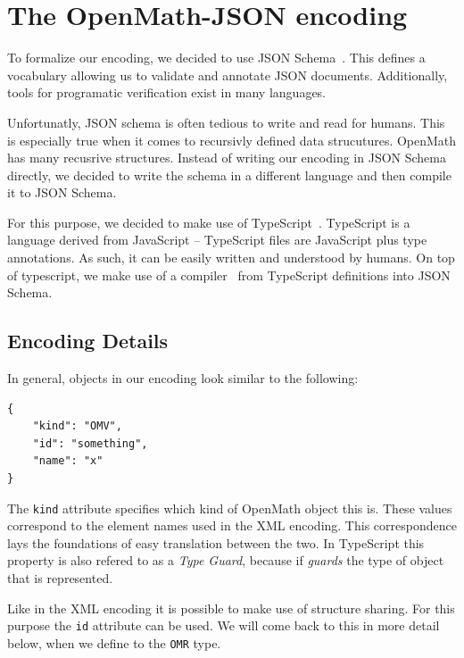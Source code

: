 \section{The OpenMath-JSON encoding}

To formalize our encoding, we decided to use JSON Schema~\cite{handrewsjsonschema:18}. 
This defines a vocabulary allowing us to validate and annotate JSON documents. 
Additionally, tools for programatic verification exist in many languages. 

Unfortunatly, JSON schema is often tedious to write and read for humans. 
This is especially true when it comes to recursivly defined data strucutures.
OpenMath has many recusrive structures.
Instead of writing our encoding in JSON Schema directly, we decided to write the schema in a different language and then compile it to JSON Schema. 

For this purpose, we decided to make use of TypeScript~\cite{typescript:webpage}. 
TypeScript is a language derived from JavaScript -- TypeScript files are JavaScript plus type annotations. 
As such, it can be easily written and understood by humans. 
On top of typescript, we make use of a compiler~\cite{vega-ts-jscon-schema-generator:webpage} from TypeScript definitions into JSON Schema. 

\subsection{Encoding Details}

In general, objects in our encoding look similar to the following:
\\\begin{minipage}{\linewidth}\begin{lstlisting}
{
    "kind": "OMV",
    "id": "something",
    "name": "x"
}
\end{lstlisting}\end{minipage}

The \texttt{kind} attribute specifies which kind of OpenMath object this is. 
These values correspond to the element names used in the XML encoding. 
This correspondence lays the foundations of easy translation between the two. 
In TypeScript this property is also refered to as a \textit{Type Guard}, because if \textit{guards} the type of object that is represented. 

Like in the XML encoding it is possible to make use of structure sharing. 
For this purpose the \texttt{id} attribute can be used. 
We will come back to this in more detail below, when we define to the \texttt{OMR} type.


